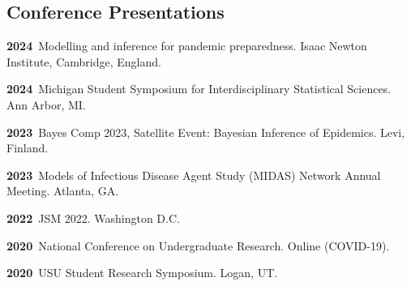 \documentclass[11pt]{article}
\newenvironment {reflist}
                {
                 \begin{list}{}
                 {\setlength{\labelwidth}{0mm}
                  \setlength{\leftmargin}{8mm}
                  \setlength{\itemindent}{-3mm}
                  \setlength{\labelsep}{0mm}
                  \setlength{\parsep}{0.1 ex}
                  \setlength{\itemsep}{0.1cm}
      \setlength{\topsep}{0.15cm}}} %
   {\end{list}}
\begin{document}
\subsection*{Conference Presentations}

\begin{reflist}

    \item \textbf{2024}\, Modelling and inference for pandemic preparedness. Isaac Newton Institute, Cambridge, England.

    \item \textbf{2024}\, Michigan Student Symposium for Interdisciplinary Statistical Sciences. Ann Arbor, MI.

    \item \textbf{2023}\, Bayes Comp 2023, Satellite Event: Bayesian Inference of Epidemics. Levi, Finland.

    \item \textbf{2023}\, Models of Infectious Disease Agent Study (MIDAS) Network Annual Meeting. Atlanta, GA.

    \item \textbf{2022}\, JSM 2022. Washington D.C.

     \item \textbf{2020}\, National Conference on Undergraduate Research. Online (COVID-19).

    \item \textbf{2020}\, USU Student Research Symposium. Logan, UT.


\end{reflist}
\end{document}
